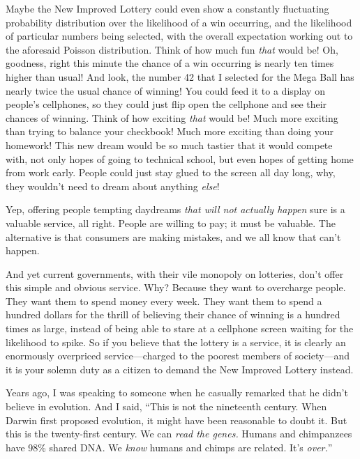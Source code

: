 {
 Maybe the New Improved Lottery could even show a constantly
fluctuating probability distribution over the likelihood of a win
occurring, and the likelihood of particular numbers being selected,
with the overall expectation working out to the aforesaid Poisson
distribution. Think of how much fun \textit{that} would be! Oh,
goodness, right this minute the chance of a win occurring is nearly ten
times higher than usual! And look, the number 42 that I selected for
the Mega Ball has nearly twice the usual chance of winning! You could
feed it to a display on people's cellphones, so they
could just flip open the cellphone and see their chances of winning.
Think of how exciting \textit{that} would be! Much more exciting than
trying to balance your checkbook! Much more exciting than doing your
homework! This new dream would be so much tastier that it would compete
with, not only hopes of going to technical school, but even hopes of
getting home from work early. People could just stay glued to the
screen all day long, why, they wouldn't need to dream
about anything \textit{else}!}

{
 Yep, offering people tempting daydreams \textit{that will not
actually happen} sure is a valuable service, all right. People are
willing to pay; it must be valuable. The alternative is that consumers
are making mistakes, and we all know that can't
happen.}

{
 And yet current governments, with their vile monopoly on
lotteries, don't offer this simple and obvious service.
Why? Because they want to overcharge people. They want them to spend
money every week. They want them to spend a hundred dollars for the
thrill of believing their chance of winning is a hundred times as
large, instead of being able to stare at a cellphone screen waiting for
the likelihood to spike. So if you believe that the lottery is a
service, it is clearly an enormously overpriced service---charged to
the poorest members of society---and it is your solemn duty as a
citizen to demand the New Improved Lottery instead.}

\myendsectiontext


{
 Years ago, I was speaking to someone when he casually remarked
that he didn't believe in evolution. And I said,
``This is not the nineteenth century. When Darwin
first proposed evolution, it might have been reasonable to doubt it.
But this is the twenty-first century. We can \textit{read the genes.}
Humans and chimpanzees have 98\% shared DNA. We \textit{know} humans
and chimps are related. It's
\textit{over.}'' }


